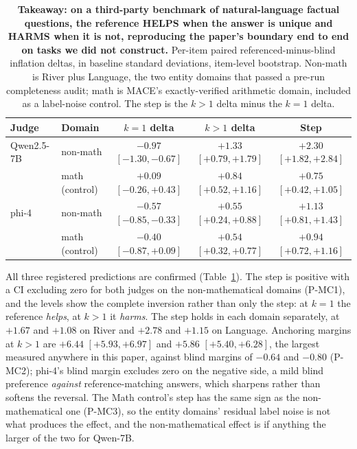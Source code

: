 \documentclass[11pt]{article}
\begin{document}
\begin{table}[tbp]
\centering
\small
\setlength{\tabcolsep}{5pt}
\begin{tabular}{llccc}
\toprule
Judge & Domain & $k{=}1$ delta & $k{>}1$ delta & Step \\
\midrule
Qwen2.5-7B & non-math & $\mathbf{-0.97}$ {\scriptsize$[-1.30,-0.67]$} & $\mathbf{+1.33}$ {\scriptsize$[+0.79,+1.79]$} & $\mathbf{+2.30}$ {\scriptsize$[+1.82,+2.84]$} \\
 & math (control) & $+0.09$ {\scriptsize$[-0.26,+0.43]$} & $+0.84$ {\scriptsize$[+0.52,+1.16]$} & $+0.75$ {\scriptsize$[+0.42,+1.05]$} \\
\addlinespace
phi-4 & non-math & $\mathbf{-0.57}$ {\scriptsize$[-0.85,-0.33]$} & $\mathbf{+0.55}$ {\scriptsize$[+0.24,+0.88]$} & $\mathbf{+1.13}$ {\scriptsize$[+0.81,+1.43]$} \\
 & math (control) & $-0.40$ {\scriptsize$[-0.87,+0.09]$} & $+0.54$ {\scriptsize$[+0.32,+0.77]$} & $+0.94$ {\scriptsize$[+0.72,+1.16]$} \\
\bottomrule
\end{tabular}
\caption{\textbf{Takeaway: on a third-party benchmark of natural-language factual questions, the reference HELPS when the answer is unique and HARMS when it is not, reproducing the paper's boundary end to end on tasks we did not construct.}
Per-item paired referenced-minus-blind inflation deltas, in baseline standard deviations, item-level bootstrap. Non-math is River plus Language, the two entity domains that passed a pre-run completeness audit; math is \textsc{MACE}'s exactly-verified arithmetic domain, included as a label-noise control. The step is the $k{>}1$ delta minus the $k{=}1$ delta.}
\label{tab:mace}
\end{table}

All three registered predictions are confirmed (Table~\ref{tab:mace}).
The step is positive with a CI excluding zero for both judges on the non-mathematical domains (P-MC1), and the levels show the complete inversion rather than only the step: at $k{=}1$ the reference \emph{helps}, at $k{>}1$ it \emph{harms}.
The step holds in each domain separately, at $+1.67$ and $+1.08$ on River and $+2.78$ and $+1.15$ on Language.
Anchoring margins at $k{>}1$ are $+6.44$ $[+5.93, +6.97]$ and $+5.86$ $[+5.40, +6.28]$, the largest measured anywhere in this paper, against blind margins of $-0.64$ and $-0.80$ (P-MC2); phi-4's blind margin excludes zero on the negative side, a mild blind preference \emph{against} reference-matching answers, which sharpens rather than softens the reversal.
The Math control's step has the same sign as the non-mathematical one (P-MC3), so the entity domains' residual label noise is not what produces the effect, and the non-mathematical effect is if anything the larger of the two for Qwen-7B.
\end{document}
